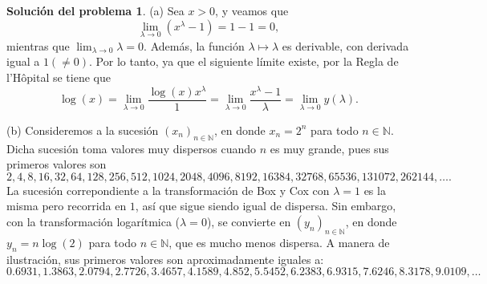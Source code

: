 \documentclass[twoside,12pt]{article}
\theoremstyle{definition}
\newtheorem{soln}{Solución del problema}
\newcommand{\NN}{\mathbb{N}}
\begin{document}
\newpage
\begin{soln}
(a) Sea $x>0$, y veamos que
\[
\lim_{\lambda\to 0} (x^{\lambda}-1) = 1-1=0,
\]
mientras que $\lim_{\lambda\to 0} \lambda = 0$. Además, la función $\lambda \mapsto \lambda$ es derivable, con derivada igual a $1(\neq 0)$. Por lo tanto, ya que el siguiente límite existe, por la Regla de l'Hôpital se tiene que
\[
\log(x) = \lim_{\lambda\to 0} \frac{\log(x) x^\lambda}{1} = \lim_{\lambda\to 0} \frac{x^{\lambda}-1}{\lambda}=\lim_{\lambda\to 0} y(\lambda).
\]

(b) Consideremos a la sucesión ${(x_n)}_{n\in\NN}$, en donde $x_n = 2^n$ para todo $n\in\NN$. Dicha sucesión toma valores muy dispersos cuando $n$ es muy grande, pues sus primeros valores son
\[
2, 4, 8, 16, 32, 64, 128, 256, 512, 1024, 2048, 4096, 8192, 16384, 32768, 65536, 131072, 262144, \ldots.
\]
La sucesión correpondiente a la transformación de Box y Cox con $\lambda=1$ es la misma pero recorrida en $1$, así que sigue siendo igual de dispersa. Sin embargo, con la transformación logarítmica ($\lambda=0$), se convierte en ${(y_n)}_{n\in\NN}$, en donde $y_n = n\log(2)$ para todo $n\in\NN$, que es mucho menos dispersa. A manera de ilustración, sus primeros valores son aproximadamente iguales a:
\[
0.6931, 1.3863, 2.0794, 2.7726, 3.4657, 4.1589, 4.852, 5.5452, 6.2383, 6.9315, 7.6246, 8.3178, 9.0109, \ldots
\]
\end{soln}
\end{document}
